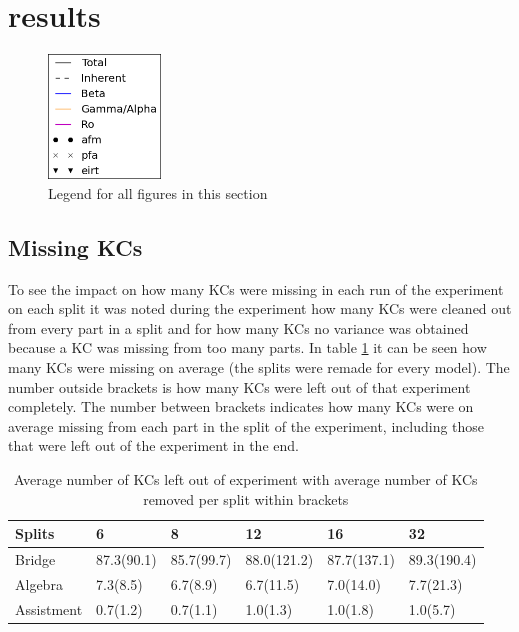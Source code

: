 \documentclass{scrartcl}
\begin{document}
\section{results}

\begin{figure}
\includegraphics[width=30mm]{images/legend.png}
\caption{Legend for all figures in this section}
\label{fig:legend}
\end{figure}

\subsection{Missing KCs}
To see the impact on how many KCs were missing in each run of the experiment on each split it was noted during the experiment how many KCs were cleaned out from every part in a split and for how many KCs no variance was obtained because a KC was missing from too many parts. In table \ref{tab:kcmis} it can be seen how many KCs were missing on average (the splits were remade for every model). The number outside brackets is how many KCs were left out of that experiment completely. The number between brackets indicates how many KCs were on average missing from each part in the split of the experiment, including those that were left out of the experiment in the end. 

\begin{center}
\begin{table}[!htbp]
\begin{tabular}{| l | l|l|l|l|l|}

    \hline
    Splits & 6  & 8 & 12 & 16 & 32 \\ \hline
    Bridge &  87.3(90.1)& 85.7(99.7)& 88.0(121.2)& 87.7(137.1)& 89.3(190.4) \\ \hline
    Algebra & 7.3(8.5)& 6.7(8.9)& 6.7(11.5)& 7.0(14.0)& 7.7(21.3) \\ \hline
    Assistment & 0.7(1.2)& 0.7(1.1)& 1.0(1.3)& 1.0(1.8)& 1.0(5.7) \\ \hline

\end{tabular}
\caption{Average number of KCs left out of experiment with average number of KCs removed per split within brackets}
\label{tab:kcmis}
\end{table}
\end{center}
\end{document}
